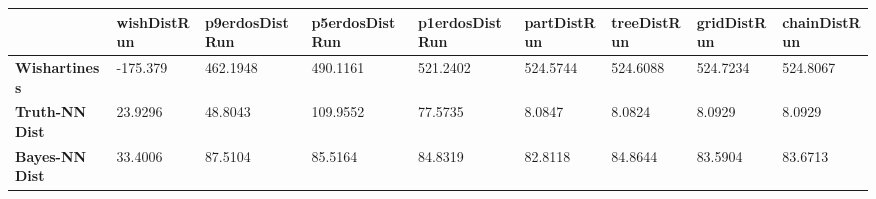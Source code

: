 \begin{tabular}{|l|l|l|l|l|l|l|l|l|}
\hline
&\textbf{wishDistRun}&\textbf{p9erdosDistRun}&\textbf{p5erdosDistRun}&\textbf{p1erdosDistRun}&\textbf{partDistRun}&\textbf{treeDistRun}&\textbf{gridDistRun}&\textbf{chainDistRun}\\\hline
\textbf{Wishartiness}&-175.379&462.1948&490.1161&521.2402&524.5744&524.6088&524.7234&524.8067\\\hline
\textbf{Truth-NN Dist}&23.9296&48.8043&109.9552&77.5735&8.0847&8.0824&8.0929&8.0929\\\hline
\textbf{Bayes-NN Dist}&33.4006&87.5104&85.5164&84.8319&82.8118&84.8644&83.5904&83.6713\\\hline
\end{tabular}
